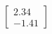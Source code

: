 \documentclass[preview]{standalone}
\begin{document}
\begin{align*}
\begin{bmatrix} 2.34 \\ -1.41 \end{bmatrix}
\end{align*}
\end{document}
